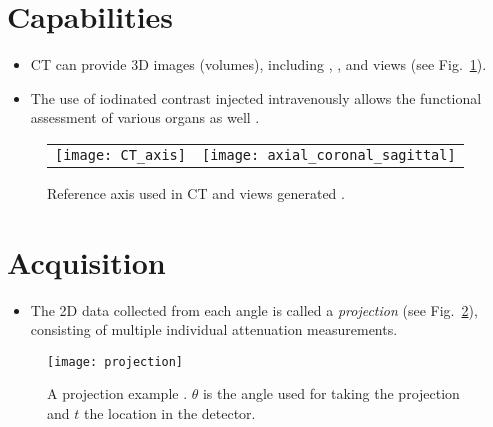 \section{Capabilities}
\begin{itemize}
\item CT can provide  3D images (volumes), including
  , , and 
  views (see Fig.~\ref{fig:views_in_CT}).
\item The use of
  iodinated contrast injected intravenously allows the functional
  assessment of various organs as well \cite{bushberg2011essential}.
\end{itemize}
\vspace{-4ex}
\begin{figure}[!b]
  \centering
  \begin{tabular}{cc}
    \texttt{[image: CT\_axis]} & \texttt{[image: axial\_coronal\_sagittal]}
  \end{tabular}
  \caption{Reference axis used in CT and views generated
    \cite{morin2025radiation}.\label{fig:views_in_CT}}
\end{figure}

\section{Acquisition}
\begin{itemize}
\item The 2D data collected from each angle is called a \emph{projection}
(see Fig.~\ref{fig:projection}), consisting of multiple individual
attenuation measurements.
\end{itemize}
\vspace{-5ex}
\begin{figure}[!b]
  \centering
  \texttt{[image: projection]}
  \caption{A projection example \cite{takase2025CT}. $\theta$ is the
    angle used for taking the projection and $t$ the location in
    the detector.\label{fig:projection}}
\end{figure}

